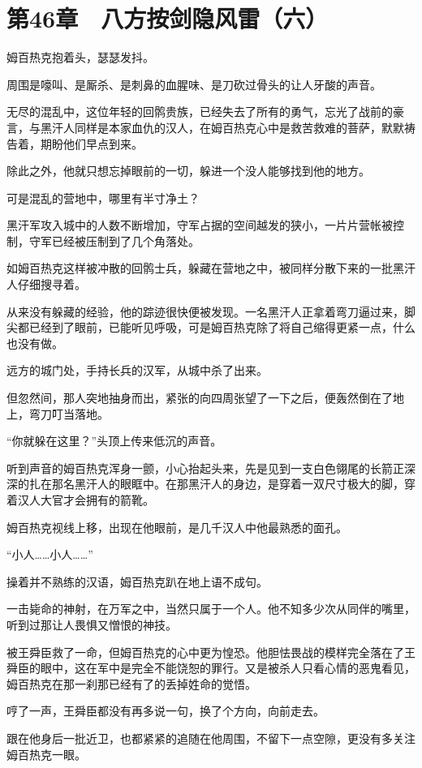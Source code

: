 \section{第46章　八方按剑隐风雷（六）}

 姆百热克抱着头，瑟瑟发抖。

周围是嚎叫、是厮杀、是刺鼻的血腥味、是刀砍过骨头的让人牙酸的声音。

无尽的混乱中，这位年轻的回鹘贵族，已经失去了所有的勇气，忘光了战前的豪言，与黑汗人同样是本家血仇的汉人，在姆百热克心中是救苦救难的菩萨，默默祷告着，期盼他们早点到来。

除此之外，他就只想忘掉眼前的一切，躲进一个没人能够找到他的地方。

可是混乱的营地中，哪里有半寸净土？

黑汗军攻入城中的人数不断增加，守军占据的空间越发的狭小，一片片营帐被控制，守军已经被压制到了几个角落处。

如姆百热克这样被冲散的回鹘士兵，躲藏在营地之中，被同样分散下来的一批黑汗人仔细搜寻着。

从来没有躲藏的经验，他的踪迹很快便被发现。一名黑汗人正拿着弯刀逼过来，脚尖都已经到了眼前，已能听见呼吸，可是姆百热克除了将自己缩得更紧一点，什么也没有做。

远方的城门处，手持长兵的汉军，从城中杀了出来。

但忽然间，那人突地抽身而出，紧张的向四周张望了一下之后，便轰然倒在了地上，弯刀叮当落地。

“你就躲在这里？”头顶上传来低沉的声音。

听到声音的姆百热克浑身一颤，小心抬起头来，先是见到一支白色翎尾的长箭正深深的扎在那名黑汗人的眼眶中。在那黑汗人的身边，是穿着一双尺寸极大的脚，穿着汉人大官才会拥有的箭靴。

姆百热克视线上移，出现在他眼前，是几千汉人中他最熟悉的面孔。

“小人……小人……”

操着并不熟练的汉语，姆百热克趴在地上语不成句。

一击毙命的神射，在万军之中，当然只属于一个人。他不知多少次从同伴的嘴里，听到过那让人畏惧又憎恨的神技。

被王舜臣救了一命，但姆百热克的心中更为惶恐。他胆怯畏战的模样完全落在了王舜臣的眼中，这在军中是完全不能饶恕的罪行。又是被杀人只看心情的恶鬼看见，姆百热克在那一刹那已经有了的丢掉姓命的觉悟。

哼了一声，王舜臣都没有再多说一句，换了个方向，向前走去。

跟在他身后一批近卫，也都紧紧的追随在他周围，不留下一点空隙，更没有多关注姆百热克一眼。

